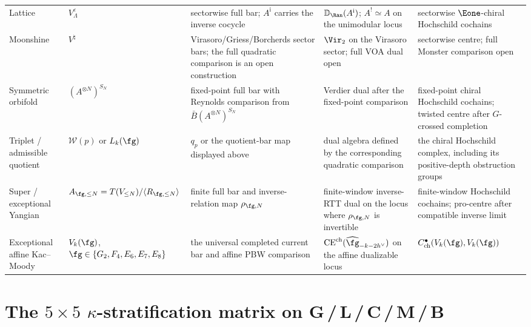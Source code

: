 {\begin{longtable}{@{}p{}p{}p{}p{}p{}@{}}
Lattice &
\(V_\Lambda^\varepsilon\) &
sectorwise full bar; \(A^{\mathrm i}\) carries the inverse cocycle &
\(\mathbb D_{\Ran}(A^{\mathrm i})\);
\(A^!\simeq A\) on the unimodular locus &
sectorwise \(\Eone\)-chiral Hochschild cochains \\

Moonshine &
\(V^\natural\) &
Virasoro/Griess/Borcherds sector bars; the full quadratic comparison
is an open construction &
\(\Vir_2\) on the Virasoro sector; full VOA dual open &
sectorwise centre; full Monster comparison open \\

Symmetric orbifold &
\((A^{\otimes N})^{S_N}\) &
fixed-point full bar with Reynolds comparison from
\(\bar B(A^{\otimes N})^{S_N}\) &
Verdier dual after the fixed-point comparison &
fixed-point chiral Hochschild cochains; twisted centre after
\(G\)-crossed completion \\

Triplet / admissible quotient &
\(\mathcal W(p)\) or \(L_k(\fg)\) &
\(q_p\) or the quotient-bar map displayed above &
dual algebra defined by the corresponding quadratic comparison &
the chiral Hochschild complex, including its positive-depth
obstruction groups \\

Super / exceptional Yangian &
\(A_{\fg,\le N}=T(V_{\le N})/\langle R_{\fg,\le N}\rangle\) &
finite full bar and inverse-relation map \(\rho_{\fg,N}\) &
finite-window inverse-RTT dual on the locus where \(\rho_{\fg,N}\)
is invertible &
finite-window Hochschild cochains; pro-centre after compatible inverse
limit \\

Exceptional affine Kac--Moody &
\(V_k(\fg)\), \(\fg\in\{G_2,F_4,E_6,E_7,E_8\}\) &
the universal completed current bar and affine PBW comparison &
\(\mathrm{CE}^{\mathrm{ch}}
(\widehat{\fg}_{-k-2h^\vee})\) on the affine dualizable locus &
\(C^\bullet_{\mathrm{ch}}(V_k(\fg),V_k(\fg))\) \\
\bottomrule
\end{longtable}
}

\providecommand{\PhiFA}{\Phi^{\mathrm{FA}}}
\providecommand{\SpCh}{\mathrm{Sp}^{\mathrm{ch}}}
\providecommand{\EdHolFA}{E_d\text{-}\mathrm{HolFA}}
\providecommand{\EnHolFA}{E_n\text{-}\mathrm{HolFA}}

\section*{The $5\times 5$ $\kappa$-stratification matrix on
G\,/\,L\,/\,C\,/\,M\,/\,B}
\label{sec:five-by-five-kappa-matrix}

